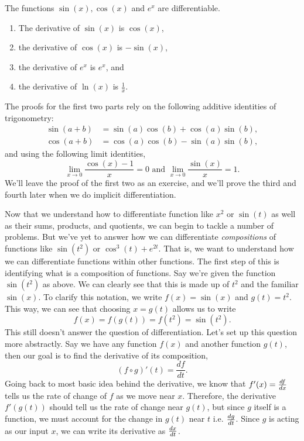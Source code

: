 \begin{prop}\label{SinCosExpDif}
  The functions $\sin(x), \cos(x)$ and $e^x$ are differentiable.
  \begin{enumerate}
\item The derivative of $\sin(x)$ is $\cos(x)$,
\item the derivative of $\cos(x)$ is $-\sin(x)$,
\item the derivative of $e^x$ is $e^x$, and
\item the derivative of $\ln(x)$ is $\frac{1}{x}$.
\end{enumerate}
\end{prop}
The proofs for the first two parts rely on the following additive identities of trigonometry:
\begin{align}
   \sin(a+b)&=\sin(a)\cos(b)+\cos(a)\sin(b),\\
   \cos(a+b)&=\cos(a)\cos(b)-\sin(a)\sin(b),
\end{align}
and using the following limit identities,
\begin{equation}
  \lim\limits_{x\to 0}\frac{\cos(x)-1}{x}=0 \text{ and } \lim\limits_{x\to 0}\frac{\sin(x)}{x} =1.
\end{equation}
We'll leave the proof of the first two as an exercise, and we'll prove the third and fourth later when we do implicit differentiation.

Now that we understand how to differentiate function like $x^2$ or $\sin(t)$ as well as their sums, products, and quotients, we can begin to tackle a number of problems. But we've yet to answer how we can differentiate \emph{compositions} of functions like $\sin(t^2)$ or $\cos^3(t) + e^{2t}$. That is, we want to understand how we can differentiate functions within other functions. The first step of this is identifying what is a composition of functions. Say we're given the function $\sin(t^2)$ as above. We can clearly see that this is made up of $t^2$ and the familiar $\sin(x)$. To clarify this notation, we write $f(x) = \sin(x)$ and $g(t) = t^2$.  This way, we can see that choosing $x = g(t)$ allows us to write
\[
f(x) = f(g(t)) = f(t^2) = \sin (t^2).
\]
This still doesn't answer the question of differentiation. Let's set up this question more abstractly. Say we have any function $f(x)$ and another function $g(t)$, then our goal is to find the derivative of its composition,
\[
(f\circ g)'(t) = \frac{df}{dt}.
\]
Going back to most basic idea behind the derivative, we know that $f'(x) = \frac{d f}{d x}$ tells us the rate of change of $f$ as we move near $x$. Therefore, the derivative $f'(g(t))$ should tell us the rate of change near $g(t)$, but since $g$ itself is a function, we must account for the change in $g(t)$ near $t$ i.e. $\frac{d g}{d t}$. Since $g$ is acting as our input $x$, we can write its derivative as $\frac{d x}{d t}$.

